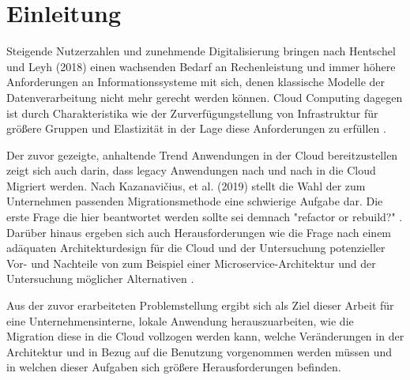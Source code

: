 
\chapter{Einleitung}


Steigende Nutzerzahlen und zunehmende Digitalisierung bringen nach Hentschel und Leyh (2018) einen wachsenden Bedarf an Rechenleistung und immer höhere Anforderungen an Informationssysteme mit sich, denen klassische Modelle der Datenverarbeitung nicht mehr gerecht werden können. Cloud Computing dagegen ist durch Charakteristika wie der Zurverfügungstellung von Infrastruktur für größere Gruppen und Elastizität \cite[Vgl.][S. 2]{Mell2011} in der Lage diese Anforderungen zu erfüllen \cite[Vgl.][S. 6]{Reinheimer2018}.

Der zuvor gezeigte, anhaltende Trend Anwendungen in der Cloud bereitzustellen zeigt sich auch darin, dass legacy Anwendungen nach und nach in die Cloud Migriert werden. Nach Kazanavičius, et al. (2019) stellt die Wahl der zum Unternehmen passenden Migrationsmethode eine schwierige Aufgabe dar. Die erste Frage die hier beantwortet werden sollte sei demnach "refactor or rebuild?" \cite[Vgl.][S. 4]{Kazanavicius2019}. Darüber hinaus ergeben sich auch Herausforderungen wie die Frage nach einem adäquaten Architekturdesign für die Cloud \cite[Vgl.][S. 14]{Pahl} und der Untersuchung potenzieller Vor- und Nachteile
von zum Beispiel einer Microservice-Architektur und der Untersuchung möglicher Alternativen \cite[Vgl.][S. 3]{Carrasco2018}.

Aus der zuvor erarbeiteten Problemstellung ergibt sich als Ziel dieser Arbeit für eine Unternehmensinterne, lokale Anwendung herauszuarbeiten, wie die Migration diese in die Cloud vollzogen werden kann, welche Veränderungen in der Architektur und in Bezug auf die Benutzung vorgenommen werden müssen und in welchen dieser Aufgaben sich größere Herausforderungen befinden.

